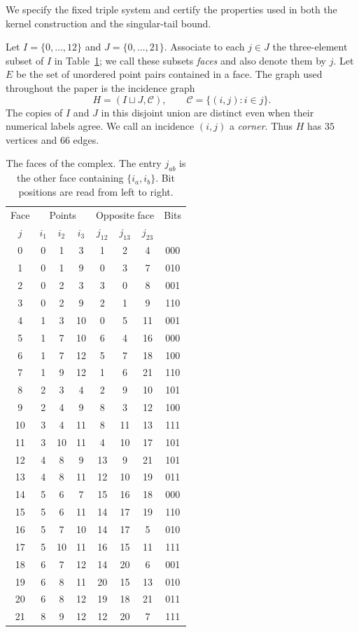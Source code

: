 We specify the fixed triple system and certify the properties used in
both the kernel construction and the singular-tail bound.

Let $I=\{0,\ldots,12\}$ and $J=\{0,\ldots,21\}$. Associate to
each $j\in J$ the three-element subset of $I$ in Table~\ref{tab:complex};
we call these subsets \emph{faces} and also denote them by $j$.
Let $E$ be the set of unordered point pairs contained in a face.
The graph used throughout the paper is the incidence graph
\[
 H=(I\sqcup J,\mathscr C),\qquad
 \mathscr C=\{(i,j):i\in j\}.
\]
The copies of $I$ and $J$ in this disjoint union are distinct even when
their numerical labels agree. We call an incidence $(i,j)$ a
\emph{corner}. Thus $H$ has $35$ vertices and $66$ edges.

\begin{table}[htbp]
\centering
\small
\setlength{\tabcolsep}{7pt}
\begin{tabular}{c@{\qquad}ccc@{\qquad}ccc@{\qquad}c}
\toprule
Face&\multicolumn{3}{c}{Points}&\multicolumn{3}{c}{Opposite face}&Bits\\
 $j$&$i_1$&$i_2$&$i_3$&$j_{12}$&$j_{13}$&$j_{23}$&\\
\midrule
0 &0&1&3   &1&2&4   &000\\
1 &0&1&9   &0&3&7   &010\\
2 &0&2&3   &3&0&8   &001\\
3 &0&2&9   &2&1&9   &110\\
4 &1&3&10  &0&5&11  &001\\
5 &1&7&10  &6&4&16  &000\\
6 &1&7&12  &5&7&18  &100\\
7 &1&9&12  &1&6&21  &110\\
8 &2&3&4   &2&9&10  &101\\
9 &2&4&9   &8&3&12  &100\\
10&3&4&11  &8&11&13 &111\\
11&3&10&11 &4&10&17 &101\\
12&4&8&9   &13&9&21 &101\\
13&4&8&11  &12&10&19&011\\
14&5&6&7   &15&16&18&000\\
15&5&6&11  &14&17&19&110\\
16&5&7&10  &14&17&5 &010\\
17&5&10&11 &16&15&11&111\\
18&6&7&12  &14&20&6 &001\\
19&6&8&11  &20&15&13&010\\
20&6&8&12  &19&18&21&011\\
21&8&9&12  &12&20&7 &111\\
\bottomrule
\end{tabular}
\caption{The faces of the complex. The entry $j_{ab}$ is the other
face containing $\{i_a,i_b\}$. Bit positions are read from left to right.}
\label{tab:complex}
\end{table}
